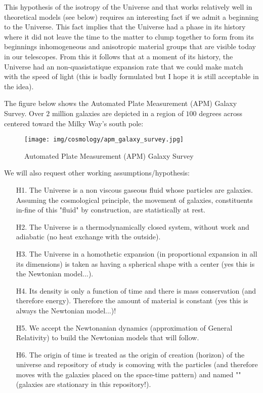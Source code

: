 	\begin{tcolorbox}[title=Remark,colframe=black,arc=10pt]
	This hypothesis of the isotropy of the Universe and that works relatively well in theoretical models (see below) requires an interesting fact if we admit a beginning to the Universe. This fact implies that the Universe had a phase in its history where it did not leave the time to the matter to clump together to form from its beginnings inhomogeneous and anisotropic material groups that are visible today in our telescopes. From this it follows that at a moment of its history, the Universe had an non-quasistatique expansion rate that we could make match with the speed of light (this is badly formulated but I hope it is still acceptable in the idea).
	\end{tcolorbox}
	The figure below shows the Automated Plate Measurement (APM) Galaxy Survey. Over $2$ million galaxies are depicted in a region of $100$
degrees across centered toward the Milky Way's south pole:
	\begin{figure}[H]
		\begin{center}
		\texttt{[image: img/cosmology/apm\_galaxy\_survey.jpg]}
		\end{center}	
		\caption{Automated Plate Measurement (APM) Galaxy Survey}
	\end{figure}
	\pagebreak
	We will also request other working assumptions/hypothesis:
	\begin{itemize}
		\item[H1.] The Universe is a non viscous gaseous fluid whose particles are galaxies. Assuming the cosmological principle, the movement of galaxies, constituents in-fine of this "fluid" by construction, are statistically at rest.
		
		\item[H2.] The Universe is a thermodynamically closed system, without work and adiabatic (no heat exchange with the outside).
		
		\item[H3.] The Universe in a homothetic expansion (in proportional expansion in all its dimensions) is taken as having a spherical shape with a center (yes this is the Newtonian model...).
		
		\item[H4.] Its density is only a function of time and there is mass conservation (and therefore energy). Therefore the amount of material is constant (yes this is always the Newtonian model...)!
		
		\item[H5.] We accept the Newtonanian dynamics (approximation of General Relativity) to build the Newtonian models that will follow.
		
		\item[H6.] The origin of time is treated as the origin of creation (horizon) of the universe and repository of study is comoving with the particles (and therefore moves with the galaxies placed on the space-time pattern) and named "" (galaxies are stationary in this repository!).
	\end{itemize}


